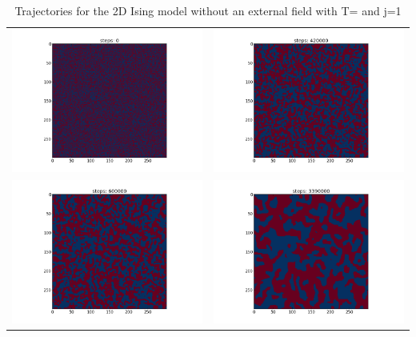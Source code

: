 \documentclass[12pt,a4paper,titlepage]{article}
\begin{document}
\begin{table}
\centering
\caption{Trajectories for the 2D Ising model without an external field with T= and j=1}
\begin{tabular}{cc}
\includegraphics[trim=4cm 0cm 1cm 0cm, width=7cm]{Plots/Trajectory_2D_0} & \includegraphics[trim=4cm 0cm 1cm 0cm, width=7cm]{Plots/Trajectory_2D_1} \\
\includegraphics[trim=4cm 0cm 1cm 0cm, width=7cm]{Plots/Trajectory_2D_2} &  \includegraphics[trim=4cm 0cm 1cm 0cm, width=7cm]{Plots/Trajectory_2D_3} \\

\end{tabular}
\end{table}
\end{document}
